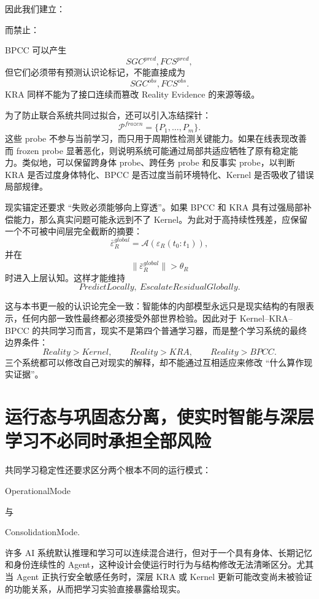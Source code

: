 因此我们建立：
\begin{statementbox}
\centering
{}
\end{statementbox}
而禁止：
\begin{statementbox}
\centering
{}
\end{statementbox}
BPCC 可以产生
\[
SGC^{pred},
FCS^{pred},
\]
但它们必须带有预测认识论标记，不能直接成为
\[
SGC^{obs},
FCS^{obs}.
\]
KRA 同样不能为了接口连续而篡改 Reality Evidence 的来源等级。

为了防止联合系统共同过拟合，还可以引入冻结探针：
\[
\mathcal P^{frozen}
=
\{P_1,\ldots,P_m\}.
\]
这些 probe 不参与当前学习，而只用于周期性检测关键能力。如果在线表现改善而 frozen probe 显著恶化，则说明系统可能通过局部共适应牺牲了原有稳定能力。类似地，可以保留跨身体 probe、跨任务 probe 和反事实 probe，以判断 KRA 是否过度身体特化、BPCC 是否过度当前环境特化、Kernel 是否吸收了错误局部规律。

现实锚定还要求 ``失败必须能够向上穿透''。如果 BPCC 和 KRA 具有过强局部补偿能力，那么真实问题可能永远到不了 Kernel。为此对于高持续性残差，应保留一个不可被中间层完全截断的摘要：
\[
\bar\varepsilon_R^{global}
=
\mathcal A
\left(
\varepsilon_R(t_0:t_1)
\right),
\]
并在
\[
\|\bar\varepsilon_R^{global}\|>\theta_R
\]
时进入上层认知。这样才能维持
\[
\boxed{
PredictLocally,\ EscalateResidualGlobally.
}
\]

这与本书更一般的认识论完全一致：智能体的内部模型永远只是现实结构的有限表示，任何内部一致性最终都必须接受外部世界检验。因此对于 Kernel--KRA--BPCC 的共同学习而言，现实不是第四个普通学习器，而是整个学习系统的最终边界条件：
\[
\boxed{
Reality
>
Kernel,
\qquad
Reality
>
KRA,
\qquad
Reality
>
BPCC.
}
\]
三个系统都可以修改自己对现实的解释，却不能通过互相适应来修改 ``什么算作现实证据''。

\section{运行态与巩固态分离，使实时智能与深层学习不必同时承担全部风险}

共同学习稳定性还要求区分两个根本不同的运行模式：
\begin{statementbox}
OperationalMode
\end{statementbox}
与
\begin{statementbox}
ConsolidationMode.
\end{statementbox}
许多 AI 系统默认推理和学习可以连续混合进行，但对于一个具有身体、长期记忆和身份连续性的 Agent，这种设计会使运行时行为与结构修改无法清晰区分。尤其当 Agent 正执行安全敏感任务时，深层 KRA 或 Kernel 更新可能改变尚未被验证的功能关系，从而把学习实验直接暴露给现实。

